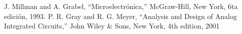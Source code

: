 \documentclass[letterpaper, 10 pt, conference]{ieeeconf}  %
\begin{document}





\begin{thebibliography}{99}

 J. Millman and A. Grabel, ``Microelectrónica,” McGraw-Hill, New York, 6ta edición, 1993.
 P. R. Gray and R. G. Meyer, ``Analysis and Design of Analog Integrated Circuits,” John Wiley & Sons, New York, 4th edition, 2001



\end{thebibliography}
\end{document}
